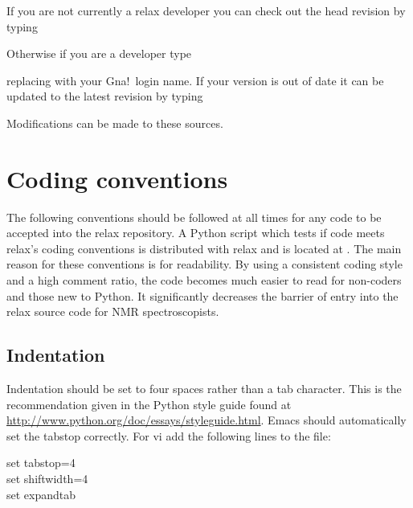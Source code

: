 If you are not currently a relax developer you can check out the head revision by typing


Otherwise if you are a developer type


replacing  with your Gna!\ login name.
If your version is out of date it can be updated to the latest revision by typing


Modifications can be made to these sources.




\section{Coding conventions}

The following conventions should be followed at all times for any code to be accepted into the relax repository.
A Python script which tests if code meets relax's coding conventions is distributed with relax and is located at .
The main reason for these conventions is for readability.
By using a consistent coding style and a high comment ratio, the code becomes much easier to read for non-coders and those new to Python.
It significantly decreases the barrier of entry into the relax source code for NMR spectroscopists.



\subsection{Indentation}

Indentation should be set to four spaces rather than a tab character.
This is the recommendation given in the Python style guide found at \href{http://www.python.org/doc/essays/styleguide.html}{http://www.python.org/doc/essays/styleguide.html}.
Emacs should automatically set the tabstop correctly.
For vi add the following lines to the  file:

\begin{exampleenv}
set tabstop=4 \\
set shiftwidth=4 \\
set expandtab
\end{exampleenv}

